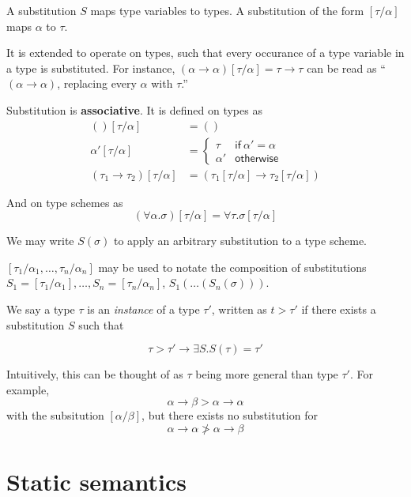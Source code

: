 A substitution $S$ maps type variables to types. A substitution of the
form $[\tau/\alpha]$ maps $\alpha$ to $\tau$.

It is extended to operate on types, such that every occurance of a
type variable in a type is substituted.
For instance, $(\alpha \rightarrow \alpha)[\tau/\alpha] = \tau \rightarrow \tau$ can be read as ``$(\alpha \rightarrow \alpha)$,
replacing every $\alpha$ with $\tau$.''

  Substitution is \textbf{associative}. It is defined on types as
  \begin{align*}
    () [\tau/\alpha] &= () \\
    \alpha' [\tau/\alpha] &=
                            \begin{cases}
                              \tau & \mathsf{if} \ \alpha' = \alpha \\
                              \alpha' & \mathsf{otherwise}
                            \end{cases} \\
    (\tau_1 \rightarrow \tau_2)[\tau/\alpha] &= (\tau_1[\tau/\alpha] \rightarrow \tau_2[\tau/\alpha])
  \end{align*}

And on type schemes as
\[(\forall \alpha . \sigma)[\tau/\alpha] = \forall \tau . \sigma[\tau/\alpha]\]

We may write $S(\sigma)$ to apply an arbitrary substitution to a type
scheme.

$[\tau_1/\alpha_1, \ldots, \tau_n/\alpha_n]$ may be used to notate the composition of
substitutions $S_1 = [\tau_1/\alpha_1], \ldots, S_n = [\tau_n/\alpha_n]$, $S_1(\ldots(S_n(\sigma)))$.

We say a type $\tau$ is an \textit{instance} of a type $\tau'$,
written as $t > \tau'$ if there exists a substitution $S$ such that

\[ \tau > \tau' \rightarrow \exists S. S(\tau) = \tau' \]

Intuitively, this can be thought of as $\tau$ being more general than
type $\tau'$. For example,
\[ \alpha \rightarrow \beta > \alpha \rightarrow \alpha \]
with the subsitution $[\alpha/\beta]$, but there exists no substitution for
\[ \alpha \rightarrow \alpha \ngtr \alpha \rightarrow \beta \]

\section{Static semantics}

